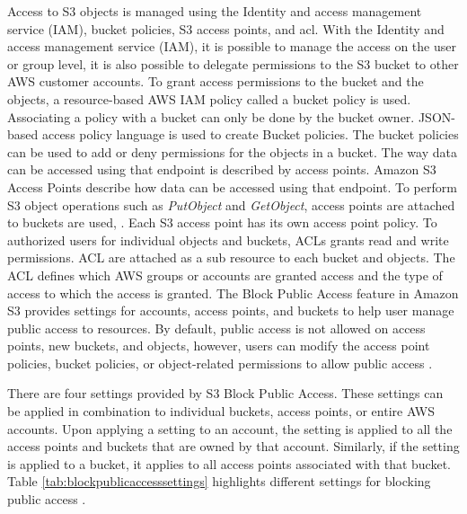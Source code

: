 \par Access to S3 objects is managed using the Identity
and access management service (IAM), bucket policies, S3
access points, and \gls{acl}.
With the Identity and access management service (IAM), it is possible to manage the access on the user or group level, it is also possible to delegate permissions to the S3 bucket to other AWS customer accounts.
To grant access permissions to the bucket and the objects, a resource-based AWS IAM policy called a bucket policy is used.
Associating a policy with a bucket can only be done by
the bucket owner.
JSON-based access policy language is used to create Bucket policies.
The bucket policies can be used to add or deny permissions for the objects in a bucket.
The way data can be accessed using that endpoint is
described by access points.
Amazon S3 Access Points describe how data can be accessed using that endpoint.
To perform S3 object operations such as
\textit{PutObject} and \textit{GetObject}, access points are
attached to buckets are used, .
Each S3 access point has its own access point policy.
To authorized users for individual objects and buckets, ACLs grants read and write permissions.
ACL are attached as a sub resource to each bucket and objects.
The ACL defines which AWS groups or accounts are granted access and the type of access to which the access is granted.
The Block Public Access feature in Amazon S3 provides settings for accounts, access points, and buckets to help user manage public access to resources.
By default, public access is not allowed on access
points, new buckets, and objects, however, users can
modify the access point policies, bucket policies, or object-related permissions to allow public access \cite{43}.

\par There are four settings provided by S3 Block Public
Access.
These settings can be applied in combination to individual buckets, access points, or entire AWS accounts. Upon applying a setting to an account, the setting is applied to all the access points and buckets that are owned by that account. Similarly, if the setting is applied to a bucket, it
applies to all access points associated with that bucket. Table \ref{tab:blockpublicaccesssettings} highlights
different settings for blocking public access \cite{23}.



